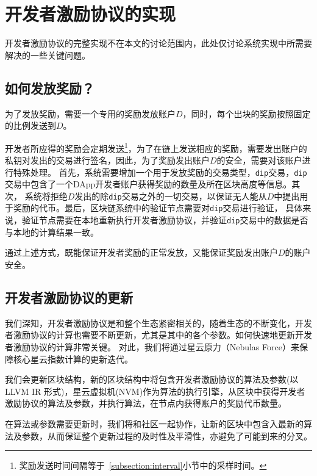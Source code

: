 \section{开发者激励协议的实现}
开发者激励协议的完整实现不在本文的讨论范围内，此处仅讨论系统实现中所需要解决的一些关键问题。

\subsection{如何发放奖励？}
为了发放奖励，需要一个专用的奖励发放账户$D$，同时，每个出块的奖励按照固定的比例发送到$D$。

开发者所应得的奖励会定期发送\footnote{奖励发送时间间隔等于~\ref{subsection:interval}小节中的采样时间。}，为了在链上发送相应的奖励，需要发出账户的私钥对发出的交易进行签名，因此，为了奖励发出账户$D$的安全，需要对该账户进行特殊处理。
首先，系统需要增加一个用于发放奖励的交易类型，\texttt{dip}交易，\texttt{dip}交易中包含了一个DApp开发者账户获得奖励的数量及所在区块高度等信息。其次，
系统将拒绝$D$发出的除\texttt{dip}交易之外的一切交易，以保证无人能从$D$中提出用于奖励的代币。最后，区块链系统中的验证节点需要对\texttt{dip}交易进行验证，
具体来说，验证节点需要在本地重新执行开发者激励协议，并验证\texttt{dip}交易中的数据是否与本地的计算结果一致。

通过上述方式，既能保证开发者奖励的正常发放，又能保证奖励发出账户$D$的账户安全。

\subsection{开发者激励协议的更新}
我们深知，开发者激励协议是和整个生态紧密相关的，随着生态的不断变化，开发者激励协议的计算也需要不断更新，尤其是其中的各个参数。如何快速地更新开发者激励协议的计算非常关键。
对此，我们将通过星云原力（Nebulas Force）来保障核心星云指数计算的更新迭代。

我们会更新区块结构，新的区块结构中将包含开发者激励协议的算法及参数(以 LLVM IR 形式)，星云虚拟机(NVM)作为算法的执行引擎，从区块中获得开发者激励协议的算法及参数，并执行算法，在节点内获得账户的奖励代币数量。

在算法或参数需要更新时，我们将和社区一起协作，让新的区块中包含入最新的算法及参数，从而保证整个更新过程的及时性及平滑性，亦避免了可能到来的分叉。
